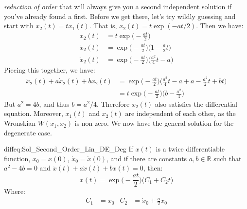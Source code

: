             \textit{reduction of order} that will always give
            you a second independent solution if you've already
            found a first. Before we get there, let's try wildly
            guessing and start with $x_{2}(t)=tx_{1}(t)$.
            That is, $x_{2}(t)=t\exp(-at/2)$. Then we have:
            \begin{subequations}
                \begin{align}
                    x_{2}(t)
                    &=t\exp\big(-\frac{at}{2}\big)\\
                    \dot{x}_{2}(t)
                    &=\exp\big(-\frac{at}{2}\big)
                    \Big(1-\frac{a}{2}t\Big)\\
                    \ddot{x}_{2}(t)
                    &=\exp\big(-\frac{at}{2}\big)
                    \Big(\frac{a^{2}}{4}t-a\Big)
                \end{align}
            \end{subequations}
            Piecing this together, we have:
            \begin{subequations}
                \begin{align}
                    \ddot{x}_{2}(t)+a\dot{x}_{2}(t)+bx_{2}(t)
                    &=\exp\big(-\frac{at}{2}\big)
                    \Big(\frac{a^{2}}{4}t-a+a-\frac{a^{2}}{2}t+bt\Big)\\
                    &=t\exp\big(-\frac{at}{2}\big)
                    \Big(b-\frac{a^{2}}{4}\Big)
                \end{align}
            \end{subequations}
            But $a^{2}=4b$, and thus $b=a^{2}/4$. Therefore
            $x_{2}(t)$ also satisfies the differential equation.
            Moreover, $x_{1}(t)$ and $x_{2}(t)$ are independent of
            each other, as the Wronskian $W(x_{1},x_{2})$ is
            non-zero. We now have the general solution for
            the degenerate case.
            \begin{ftheorem}{}{diffeq:Sol_Second_Order_Lin_DE_Deg}
                If $x(t)$ is a twice differentiable function,
                $x_{0}=x(0)$, $\dot{x}_{0}=\dot{x}(0)$, and if
                there are constants $a,b\in\mathbb{R}$ such that
                $a^{2}-4b=0$ and
                $\ddot{x}(t)+a\dot{x}(t)+bx(t)=0$, then:
                \begin{equation*}
                    x(t)=\exp\big(-\frac{at}{2}\big)
                    \big(C_{1}+C_{2}t\big)
                \end{equation*}
                Where:
                \begin{align*}
                    C_{1}&=x_{0}
                    &
                    C_{2}&=\dot{x}_{0}+\frac{a}{2}x_{0}
                \end{align*}
            \end{ftheorem}
